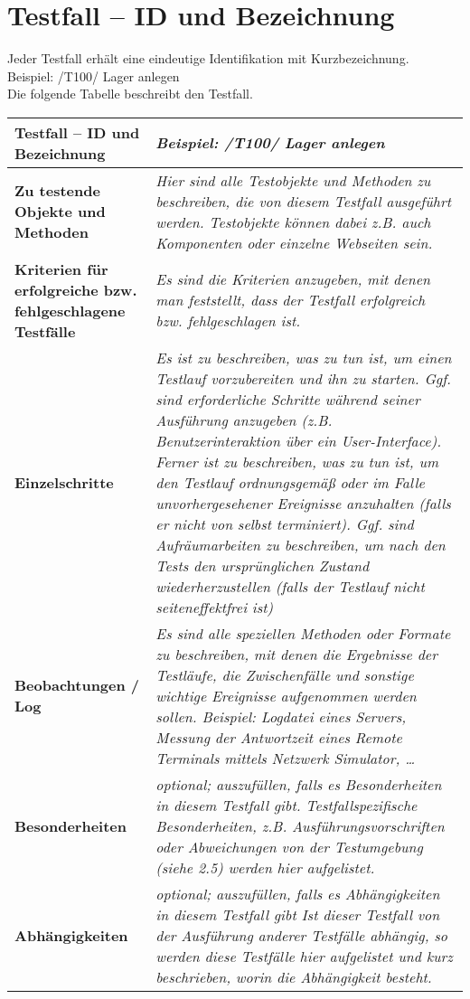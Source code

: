 \section{Testfall -- ID und Bezeichnung}
Jeder Testfall erh\"alt eine eindeutige Identifikation mit Kurzbezeichnung.\\
Beispiel: /T100/ Lager anlegen\\
Die folgende Tabelle beschreibt den Testfall. \\
\begin{longtable}{|p{7cm}|p{10cm}|}
\hline
\textbf{Testfall -- ID und Bezeichnung} &  \textit{Beispiel:
                                                        /T100/ Lager anlegen} \\
\hline
\textbf{Zu testende Objekte und Methoden} &  \textit{Hier sind alle Testobjekte
und Methoden zu beschreiben, die von diesem Testfall ausgef\"uhrt werden.
Testobjekte k\"onnen dabei z.B. auch Komponenten oder einzelne Webseiten sein.}
\\
\hline
\textbf{Kriterien f\"ur erfolgreiche bzw. fehlgeschlagene Testf\"alle} &
\textit{Es sind die Kriterien anzugeben, mit denen man feststellt, dass der
Testfall erfolgreich bzw. fehlgeschlagen ist. } \\
\hline
\textbf{Einzelschritte} &  \textit{Es ist zu beschreiben, was zu tun ist, um
einen Testlauf vorzubereiten und ihn zu starten.
Ggf. sind erforderliche Schritte w\"ahrend seiner Ausf\"uhrung anzugeben (z.B.
Benutzerinteraktion \"uber ein User-Interface). Ferner ist zu beschreiben, was zu
tun ist, um den Testlauf ordnungsgem\"aß oder im Falle unvorhergesehener
Ereignisse anzuhalten (falls er nicht von selbst terminiert).
Ggf. sind Aufr\"aumarbeiten zu beschreiben, um nach den Tests den urspr\"unglichen
Zustand wiederherzustellen (falls der Testlauf nicht seiteneffektfrei ist)
} \\
\hline
\textbf{Beobachtungen / Log} &  \textit{Es sind alle speziellen Methoden oder
Formate zu beschreiben, mit denen die Ergebnisse der Testl\"aufe, die
Zwischenf\"alle und sonstige wichtige Ereignisse aufgenommen werden sollen.
Beispiel: Logdatei eines Servers, Messung der Antwortzeit eines Remote
Terminals mittels Netzwerk Simulator, \ldots} \\
\hline
\textbf{Besonderheiten } &  \textit{optional; auszuf\"ullen, falls es
Besonderheiten in diesem Testfall gibt.
Testfallspezifische Besonderheiten, z.B. Ausf\"uhrungsvorschriften oder
Abweichungen von der Testumgebung (siehe 2.5)  werden hier aufgelistet.} \\
\hline
\textbf{Abh\"angigkeiten} &  \textit{optional; auszuf\"ullen, falls es
Abh\"angigkeiten in diesem Testfall gibt
Ist dieser Testfall von der Ausf\"uhrung anderer Testf\"alle abh\"angig, so werden
diese Testf\"alle hier aufgelistet und kurz beschrieben, worin die Abh\"angigkeit
besteht.} \\
\hline

 \end{longtable}

